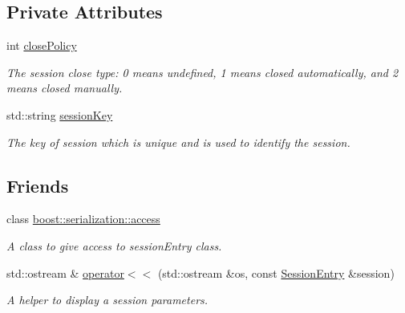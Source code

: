 \subsection*{Private Attributes}
\begin{DoxyCompactItemize}
\item 
\hypertarget{classSessionEntry_a0a04e1b5329921d8eb5fa009fa53fa90}{
int \hyperlink{classSessionEntry_a0a04e1b5329921d8eb5fa009fa53fa90}{closePolicy}}
\label{classSessionEntry_a0a04e1b5329921d8eb5fa009fa53fa90}

\begin{DoxyCompactList}\small\item\em The session close type: 0 means undefined, 1 means closed automatically, and 2 means closed manually. \item\end{DoxyCompactList}\item 
\hypertarget{classSessionEntry_a47526c8406b9ac2bc6fbe1b81e723135}{
std::string \hyperlink{classSessionEntry_a47526c8406b9ac2bc6fbe1b81e723135}{sessionKey}}
\label{classSessionEntry_a47526c8406b9ac2bc6fbe1b81e723135}

\begin{DoxyCompactList}\small\item\em The key of session which is unique and is used to identify the session. \item\end{DoxyCompactList}\end{DoxyCompactItemize}
\subsection*{Friends}
\begin{DoxyCompactItemize}
\item 
\hypertarget{classSessionEntry_ac98d07dd8f7b70e16ccb9a01abf56b9c}{
class \hyperlink{classSessionEntry_ac98d07dd8f7b70e16ccb9a01abf56b9c}{boost::serialization::access}}
\label{classSessionEntry_ac98d07dd8f7b70e16ccb9a01abf56b9c}

\begin{DoxyCompactList}\small\item\em A class to give access to sessionEntry class. \item\end{DoxyCompactList}\item 
std::ostream \& \hyperlink{classSessionEntry_a283f7dbafc8f05cebfbbc3b76dadf437}{operator$<$$<$} (std::ostream \&os, const \hyperlink{classSessionEntry}{SessionEntry} \&session)
\begin{DoxyCompactList}\small\item\em A helper to display a session parameters. \item\end{DoxyCompactList}\end{DoxyCompactItemize}


